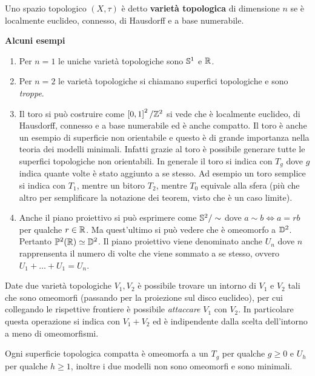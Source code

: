\begin{definition}
	Uno spazio topologico $(X,\tau)$ è detto \textbf{varietà topologica} di dimensione $n$ se è localmente euclideo, connesso, di Hausdorff e a base numerabile.
\end{definition}

\textbf{Alcuni esempi}

\begin{enumerate}
	\item Per $n=1$ le uniche varietà topologiche sono $\S^1$ e $\R$.
	\item Per $n=2$ le varietà topologiche si chiamano superfici topologiche e sono \textit{troppe}.
	\item Il toro si può costruire come $\left[0,1\right]^2/\Z^2$ si vede che è localmente euclideo, di Hausdorff, connesso e a base numerabile ed è anche compatto. Il toro è anche un esempio di superficie non orientabile e questo è di grande importanza nella teoria dei modelli minimali. Infatti grazie al toro è possibile generare tutte le superfici topologiche non orientabili. In generale il toro si indica con $T_g$ dove $g$ indica quante volte è stato aggiunto a  se stesso. Ad esempio un toro semplice si indica con $T_1$, mentre un bitoro $T_2$, mentre $T_0$ equivale alla sfera (più che altro per semplificare la notazione dei teorem, visto che è un caso limite).
	\item Anche il piano proiettivo si può esprimere come $\S^2 / \sim$ dove $a \sim b \Leftrightarrow a = rb$ per qualche $r \in \R$. Ma quest'ultimo si può vedere che è omeomorfo a $\D^2$. Pertanto $\mathbb{P}^2(\R) \simeq \D^2$. Il piano proiettivo viene denominato anche $U_n$ dove $n$ rapprensenta il numero di volte che viene sommato a se stesso, ovvero $U_1 + \dots + U_1 = U_n$.
\end{enumerate}

\begin{definition}
	Date due varietà topologiche $V_1, V_2$ è possibile trovare un intorno di $V_1$ e $V_2$ tali che sono omeomorfi (passando per la proiezione sul disco euclideo), per cui collegando le rispettive frontiere è possibile \textit{attaccare} $V_1$ con $V_2$. In particolare questa operazione si indica con $V_1 + V_2$ ed è indipendente dalla scelta dell'intorno a meno di omeomorfismi. 
\end{definition}


\begin{theorem}
	Ogni superficie topologica compatta è omeomorfa a un $T_g$ per qualche $g \ge 0$ e $U_h$ per qualche $h \ge 1$, inoltre i due modelli non sono omeomorfi e sono minimali. 
\end{theorem}

